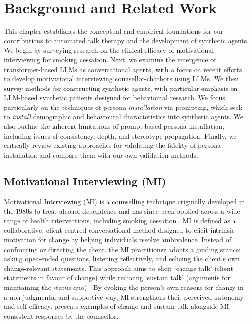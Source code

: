 \chapter{Background and Related Work}
\label{ch:background}
This chapter establishes the conceptual and empirical foundations for our contributions to automated talk therapy and the development of synthetic agents. We begin by surveying research on the clinical efficacy of motivational interviewing for smoking cessation. Next, we examine the emergence of transformer-based LLMs as conversational agents, with a focus on recent efforts to develop motivational interviewing counsellor-chatbots using LLMs. We then survey methods for constructing synthetic agents, with particular emphasis on LLM-based synthetic patients designed for behavioural research. We focus particularly on the techniques of persona \emph{installation} via prompting, which seek to \emph{install} demographic and behavioural characteristics into synthetic agents. We also outline the inherent limitations of prompt-based persona installation, including issues of consistency, depth, and stereotype propagation. Finally, we critically review existing approaches for validating the fidelity of persona installation and compare them with our own validation methods.


\section{Motivational Interviewing (MI)}
Motivational Interviewing (MI) is a counselling technique originally developed in the 1980s to treat alcohol dependence and has since been applied across a wide range of health interventions, including smoking cessation \cite{Miller1983, MillerRollnick2023}. MI is defined as a collaborative, client-centred conversational method designed to elicit intrinsic motivation for change by helping individuals resolve ambivalence. Instead of confronting or directing the client, the MI practitioner adopts a guiding stance: asking open-ended questions, listening reflectively, and echoing the client's own change-relevant statements. This approach aims to elicit `change talk' (client statements in favour of change) while reducing `sustain talk' (arguments for maintaining the status quo) \cite{MillerRose2009}. By evoking the person's own reasons for change in a non-judgmental and supportive way, MI strengthens their perceived autonomy and self-efficacy.  presents examples of change and sustain talk alongside MI-consistent responses by the counsellor.


